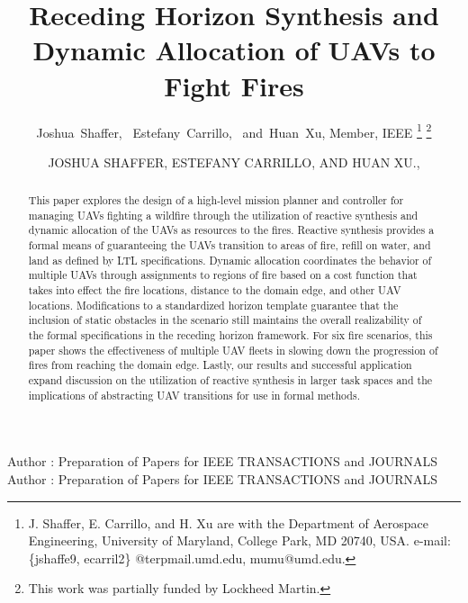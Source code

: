 \documentclass{ieeeaccess}
\begin{document}

\title{Receding Horizon Synthesis and Dynamic Allocation of UAVs to Fight Fires}

\author{Joshua~Shaffer,~
	Estefany~Carrillo,~
	and~Huan~Xu, Member, IEEE%
	\thanks{J. Shaffer, E. Carrillo, and H. Xu are with the Department of Aerospace Engineering,
		University of Maryland, College Park,
		MD 20740, USA. e-mail: \{jshaffe9, ecarril2\} @terpmail.umd.edu, mumu@umd.edu.}
	\thanks{This work was partially funded by Lockheed Martin.}}%



\author{\uppercase{Joshua Shaffer},
	\uppercase{Estefany Carrillo, and Huan Xu}.,
	}
\address[1]{Department of Aerospace Engineering, University of Maryland, College Park, MD 20740 USA (e-mail: jshaffe9@terpmail.umd.edu)}
\address[2]{Department of Aerospace Engineering, University of Maryland, College Park, MD 20740 USA (e-mail: ecarril2@terpmail.umd.edu)}
\address[3]{Department of Aerospace Engineering, University of Maryland, College Park, MD 20740 USA (e-mail: mumu@umd.edu)}

\markboth
{Author \headeretal: Preparation of Papers for IEEE TRANSACTIONS and JOURNALS}
{Author \headeretal: Preparation of Papers for IEEE TRANSACTIONS and JOURNALS}


\begin{abstract}
This paper explores the design of a high-level mission planner and controller for managing UAVs fighting a wildfire through the utilization of reactive synthesis and dynamic allocation of the UAVs as resources to the fires. Reactive synthesis provides a formal means of guaranteeing the UAVs transition to areas of fire, refill on water, and land as defined by LTL specifications. Dynamic allocation coordinates the behavior of multiple UAVs through assignments to regions of fire based on a cost function that takes into effect the fire locations, distance to the domain edge, and other UAV locations. Modifications to a standardized horizon template guarantee that the inclusion of static obstacles in the scenario still maintains the overall realizability of the formal specifications in the receding horizon framework. For six fire scenarios, this paper shows the effectiveness of multiple UAV fleets in slowing down the progression of fires from reaching the domain edge. Lastly, our results and successful application expand discussion on the utilization of reactive synthesis in larger task spaces and the implications of abstracting UAV transitions for use in formal methods.
\end{abstract}
\end{document}
